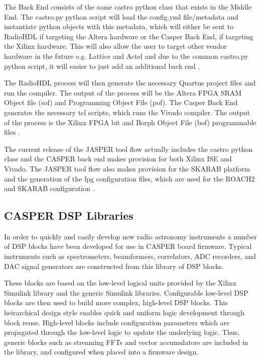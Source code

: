 \documentclass{ws-jai}
\begin{document}
The Back End consists of the same castro python class that exists in the Middle End. The castro.py python script will load the config.yml file/metadata and instantiate python objects with this metadata, which will either be sent to RadioHDL if targeting the Altera hardware or the Casper Back End, if targeting the Xilinx hardware. This will also allow the user to target other vendor hardware in the future e.g. Lattice and Actel and due to the common castro.py python script, it will easier to just add an additional back end \cite{Isaac16}.

The RadioHDL process will then generate the necessary Quartus project files and run the compiler. The output of the process will be the Altera FPGA SRAM Object file (sof) and Programming Object File (pof). The Casper Back End generates the necessary tcl scripts, which runs the Vivado compiler. The output of the process is the Xilinx FPGA bit and Borph Object File (bof) programmable files \cite{Isaac16}.

The current release of the JASPER tool flow actually includes the castro python class and the CASPER back end makes provision for both Xilinx ISE and Vivado. The JASPER tool flow also makes provision for the SKARAB platform and the generation of the fpg configuration files, which are used for the ROACH2 and SKARAB configuration \cite{Balla16}.


\subsection{CASPER DSP Libraries}



In order to quickly and easily develop new radio astronomy instruments a number
of DSP blocks have been developed for use in CASPER board firmware. Typical
instruments such as spectrometers, beamformers, correlators, ADC recorders, and
DAC signal generators are constructed from this library of DSP blocks.

These blocks are based on the low-level logical units provided by the Xilinx
Simulink library and the generic Simulink libraries. Configurable low-level DSP
blocks are then used to build more complex, high-level DSP blocks. This
heirarchical design style enables quick and uniform logic development through
block reuse. High-level blocks include configuration parameters which are
propagated through the low-level logic to update the underlying logic. Thus,
generic blocks such as streaming FFTs and vector accumulators are included in
the library, and configured when placed into a firmware design.
\end{document}
